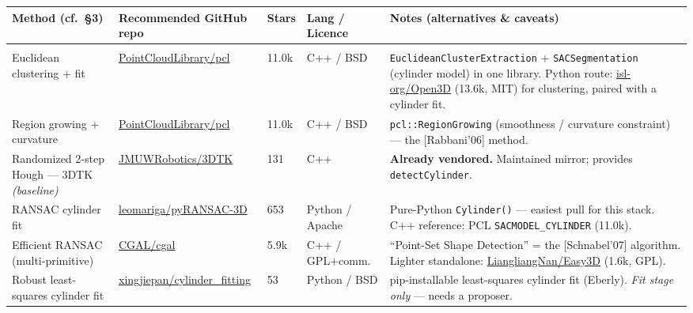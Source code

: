 \documentclass[10pt,a4paper]{article}
\begin{document}
\begin{landscape}
\footnotesize
\setlength{\extrarowheight}{2.5pt}
\renewcommand{\arraystretch}{1.05}

\begin{longtable}{@{}R{3.5cm} R{5.0cm} R{1.2cm} R{2.7cm} R{9.6cm}@{}}
\textbf{Method (cf.\ \S3)} & \textbf{Recommended GitHub repo} & \textbf{ Stars} & \textbf{Lang / Licence} & \textbf{Notes (alternatives \& caveats)}\\
\endhead

\\
Euclidean clustering + fit &
\href{https://github.com/PointCloudLibrary/pcl}{PointCloudLibrary/pcl} & 11.0k & C++ / BSD &
\texttt{EuclideanClusterExtraction} + \texttt{SACSegmentation} (cylinder model) in one library. Python route: \href{https://github.com/isl-org/Open3D}{isl-org/Open3D} (13.6k, MIT) for clustering, paired with a cylinder fit.\\

Region growing + curvature &
\href{https://github.com/PointCloudLibrary/pcl}{PointCloudLibrary/pcl} & 11.0k & C++ / BSD &
\texttt{pcl::RegionGrowing} (smoothness / curvature constraint) --- the [Rabbani'06] method.\\

Randomized 2-step Hough --- 3DTK \emph{(baseline)} &
\href{https://github.com/JMUWRobotics/3DTK}{JMUWRobotics/3DTK} & 131 & C++ &
\textbf{Already vendored.} Maintained mirror; provides \texttt{detectCylinder}.\\

RANSAC cylinder fit &
\href{https://github.com/leomariga/pyRANSAC-3D}{leomariga/pyRANSAC-3D} & 653 & Python / Apache &
Pure-Python \texttt{Cylinder()} --- easiest pull for this stack. C++ reference: PCL \texttt{SACMODEL\_CYLINDER} (11.0k).\\

Efficient RANSAC (multi-primitive) &
\href{https://github.com/CGAL/cgal}{CGAL/cgal} & 5.9k & C++ / GPL+comm. &
``Point-Set Shape Detection'' = the [Schnabel'07] algorithm. Lighter standalone: \href{https://github.com/LiangliangNan/Easy3D}{LiangliangNan/Easy3D} (1.6k, GPL).\\

Robust least-squares cylinder fit &
\href{https://github.com/xingjiepan/cylinder_fitting}{xingjiepan/cylinder\_fitting} & 53 & Python / BSD &
pip-installable least-squares cylinder fit (Eberly). \emph{Fit stage only} --- needs a proposer.\\


\end{longtable}
\end{landscape}
\end{document}
